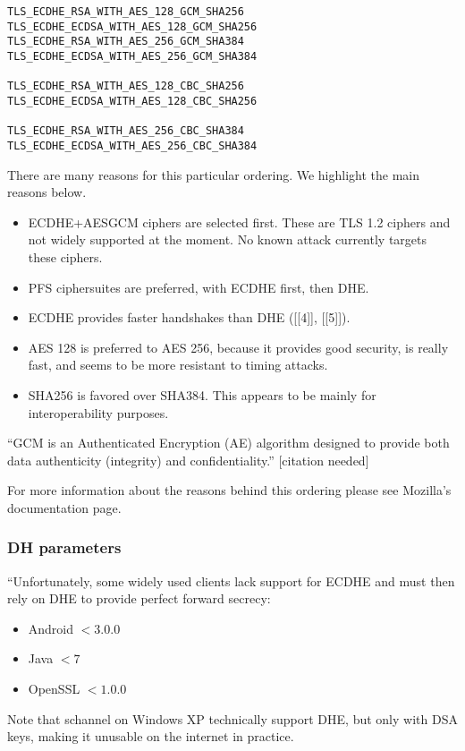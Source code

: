 \begin{verbatim}
TLS_ECDHE_RSA_WITH_AES_128_GCM_SHA256
TLS_ECDHE_ECDSA_WITH_AES_128_GCM_SHA256
TLS_ECDHE_RSA_WITH_AES_256_GCM_SHA384
TLS_ECDHE_ECDSA_WITH_AES_256_GCM_SHA384

TLS_ECDHE_RSA_WITH_AES_128_CBC_SHA256
TLS_ECDHE_ECDSA_WITH_AES_128_CBC_SHA256

TLS_ECDHE_RSA_WITH_AES_256_CBC_SHA384
TLS_ECDHE_ECDSA_WITH_AES_256_CBC_SHA384
\end{verbatim}

There are many reasons for this particular ordering. We highlight the main reasons below. 

\begin{itemize}
  \item ECDHE+AESGCM ciphers are selected first. These are TLS 1.2 ciphers and not widely supported at the moment. No known attack currently targets these ciphers.
  \item PFS ciphersuites are preferred, with ECDHE first, then DHE.
	\item ECDHE provides faster handshakes than DHE ([[4]], [[5]]).
  \item AES 128 is preferred to AES 256, because it provides good security, is really fast, and seems to be more resistant to timing attacks.
  \item SHA256 is favored over SHA384. This appears to be mainly for interoperability purposes.
\end{itemize}

``GCM is an Authenticated Encryption (AE) algorithm designed to provide both data authenticity (integrity) and confidentiality.'' [citation needed]

For more information about the reasons behind this ordering please see Mozilla's documentation page.

\subsubsection{DH parameters}
``Unfortunately, some widely used clients lack support for ECDHE and must then rely on DHE to provide perfect forward secrecy:

\begin{itemize}
	\item Android $< 3.0.0$
  \item Java $< 7$
  \item OpenSSL $< 1.0.0$
\end{itemize}

Note that schannel on Windows XP technically support DHE, but only with DSA keys, making it unusable on the internet in practice.

